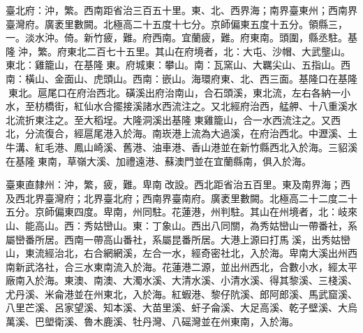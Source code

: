 \begin{pinyinscope}
臺北府：沖，繁。西南距省治三百五十里。東、北、西界海；南界臺東州；西南界臺灣府。廣袤里數闕。北極高二十五度十七分。京師偏東五度十五分。領縣三，一。淡水沖。倚。新竹疲，難。府西南。宜蘭疲，難。府東南。頭圍，縣丞駐。基隆沖，繁。府東北二百七十五里。其山在府境者，北：大屯、沙帽、大武壟山。東北：雞籠山，在基隆東。府城東：攀山。南：瓦窯山、大羈尖山、五指山。西南：橫山、金面山、虎頭山。西南：嵌山。海環府東、北、西三面。基隆口在基隆東北。扈尾口在府治西北。磺溪出府治南山，合石頭溪，東北流，左右各納一小水，至枋橋街，紅仙水合擺接溪諸水西流注之。又北經府治西，艋舺、十八重溪水北流折東注之。至大稻埕。大隆洞溪出基隆東雞籠山，合一水西流注之。又西北，分流復合，經扈尾港入於海。南崁港上流為大過溪，在府治西北。中瀝溪、土牛溝、紅毛港、鳳山崎溪、舊港、油車港、香山港並在新竹縣西北入於海。三貂溪在基隆東南，草嶺大溪、加禮遠港、蘇澳門並在宜蘭縣南，俱入於海。

臺東直隸州：沖，繁，疲，難。卑南改設。西北距省治五百里。東及南界海；西及西北界臺灣府；北界臺北府；西南界臺南府。廣袤里數闕。北極高二十二度二十五分。京師偏東四度。卑南，州同駐。花蓮港，州判駐。其山在州境者，北：岐來山、能高山。西：秀姑巒山。東：丁象山。西出八同關，為秀姑巒山一帶番社，系屬巒番所居。西南一帶高山番社，系屬昆番所居。大港上源曰打馬溪，出秀姑巒山，東流經治北，右合網網溪，左合一水，經奇密社北，入於海。卑南大溪出州西南新武洛社，合三水東南流入於海。花蓮港二源，並出州西北，合數小水，經太平廠南入於海。東澳、南澳、大濁水溪、大清水溪、小清水溪、得其黎溪、三棧溪、尤丹溪、米侖港並在州東北，入於海。紅蝦港、黎仔阬溪、郎阿郎溪、馬武窟溪、八里芒溪、呂家望溪、知本溪、大苗里溪、虷子侖溪、大足高溪、乾子壁溪、大烏萬溪、巴塱衛溪、魯木鹿溪、牡丹灣、八磘灣並在州東南，入於海。


\end{pinyinscope}